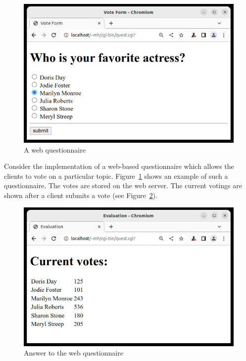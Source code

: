 \begin{figure}[t]
\begin{center}
\includegraphics[scale=0.6]{PICTURES/quest.jpg}
\end{center}\vspace{-3ex}
\caption{A web questionnaire\label{fig-quest}}
\end{figure}

Consider the implementation of a web-based questionnaire
which allows the clients to vote on a particular topic.
Figure~\ref{fig-quest} shows an example of such a questionnaire.
The votes are stored on the web server.
The current votings are shown after a client
submits a vote (see Figure~\ref{fig-quest-answer}).

\begin{figure}[t]
\begin{center}
\includegraphics[scale=0.6]{PICTURES/quest_answer.jpg}
\end{center}\vspace{-3ex}
\caption{Answer to the web questionnaire\label{fig-quest-answer}}
\end{figure}

